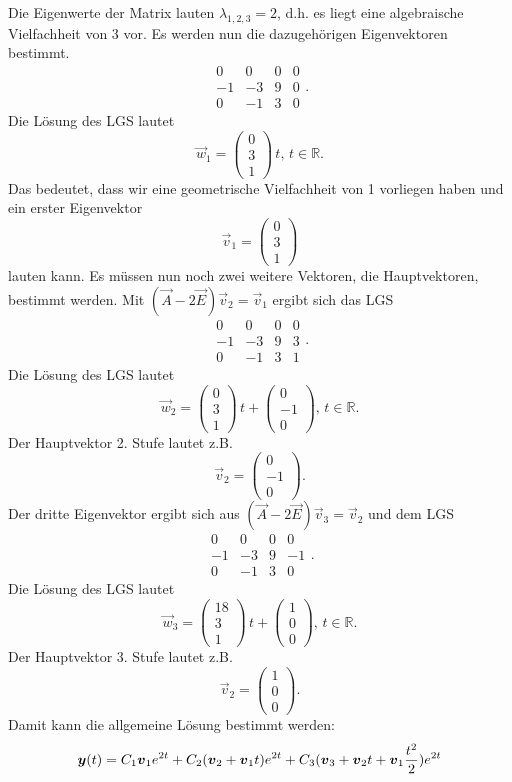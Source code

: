 Die Eigenwerte der Matrix lauten $\lambda_{1,2,3} = 2$, d.h. es liegt eine algebraische Vielfachheit von 3 vor.
Es werden nun die dazugeh\"origen Eigenvektoren bestimmt.
$$
\begin{array}{rrr|l}
0 & 0 & 0 & 0 \\
-1 & -3 & 9 & 0 \\
0 & -1 & 3 & 0 
\end{array}.
$$
Die L\"osung des LGS lautet
$$
\vec w_1 = \begin{pmatrix} 0 \\ 3 \\ 1 \end{pmatrix} \, t,\, t \in \mathbb{R}.
$$
Das bedeutet, dass wir eine geometrische Vielfachheit von 1 vorliegen haben und ein erster Eigenvektor
$$
\vec v_1 = \begin{pmatrix} 0 \\ 3 \\ 1 \end{pmatrix}
$$
lauten kann. Es m\"ussen nun noch zwei weitere Vektoren, die Hauptvektoren, bestimmt werden.
Mit $(\vec A - 2 \vec E) \vec v_2 = \vec v_{1}$ ergibt sich das LGS
$$
\begin{array}{rrr|l}
0 & 0 & 0 & 0 \\
-1 & -3 & 9 & 3 \\
0 & -1 & 3 & 1 
\end{array}.
$$
Die L\"osung des LGS lautet
$$
\vec w_2 = \begin{pmatrix} 0 \\ 3 \\ 1 \end{pmatrix} \, t + \begin{pmatrix} 0 \\ -1 \\ 0 \end{pmatrix} ,\, t \in \mathbb{R}.
$$
Der Hauptvektor 2. Stufe lautet z.B.
$$
\vec v_2 = \begin{pmatrix} 0 \\ -1 \\ 0 \end{pmatrix}.
$$
Der dritte Eigenvektor ergibt sich aus $(\vec A - 2 \vec E) \vec v_3 = \vec v_{2}$  und dem LGS
$$
\begin{array}{rrr|l}
0 & 0 & 0 & 0 \\
-1 & -3 & 9 & -1 \\
0 & -1 & 3 & 0 
\end{array}.
$$
Die L\"osung des LGS lautet
$$
\vec w_3 = \begin{pmatrix} 18 \\ 3 \\ 1 \end{pmatrix} \, t + \begin{pmatrix} 1 \\ 0 \\ 0 \end{pmatrix} ,\, t \in \mathbb{R}.
$$
Der Hauptvektor 3. Stufe lautet z.B.
$$
\vec v_2 = \begin{pmatrix} 1 \\ 0 \\ 0 \end{pmatrix}.
$$
Damit kann die allgemeine L\"osung bestimmt werden:
$$
\vec y(t) = C_1 \vec v_1 e^{2t} + C_2 (\vec v_2 + \vec v_1 t )e^{2t} + C_3 (\vec v_3 + \vec v_2 t + \vec v_1 \frac{t^2}{2}) e^{2t}\\
$$
